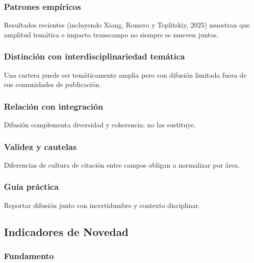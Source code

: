 \documentclass[
]{article}
\begin{document}
\hypertarget{patrones-empuxedricos}{%
\subsubsection{Patrones empíricos}\label{patrones-empuxedricos}}

Resultados recientes (incluyendo Xiang, Romero y Teplitskiy, 2025)
muestran que amplitud temática e impacto transcampo no siempre se mueven
juntos.

\hypertarget{distinciuxf3n-con-interdisciplinariedad-temuxe1tica}{%
\subsubsection{Distinción con interdisciplinariedad
temática}\label{distinciuxf3n-con-interdisciplinariedad-temuxe1tica}}

Una cartera puede ser temáticamente amplia pero con difusión limitada
fuera de sus comunidades de publicación.

\hypertarget{relaciuxf3n-con-integraciuxf3n}{%
\subsubsection{Relación con
integración}\label{relaciuxf3n-con-integraciuxf3n}}

Difusión complementa diversidad y coherencia; no las sustituye.

\hypertarget{validez-y-cautelas}{%
\subsubsection{Validez y cautelas}\label{validez-y-cautelas}}

Diferencias de cultura de citación entre campos obligan a normalizar por
área.

\hypertarget{guuxeda-pruxe1ctica}{%
\subsubsection{Guía práctica}\label{guuxeda-pruxe1ctica}}

Reportar difusión junto con incertidumbre y contexto disciplinar.

\hypertarget{indicadores-de-novedad}{%
\subsection{Indicadores de Novedad}\label{indicadores-de-novedad}}

\hypertarget{fundamento}{%
\subsubsection{Fundamento}\label{fundamento}}
\end{document}
